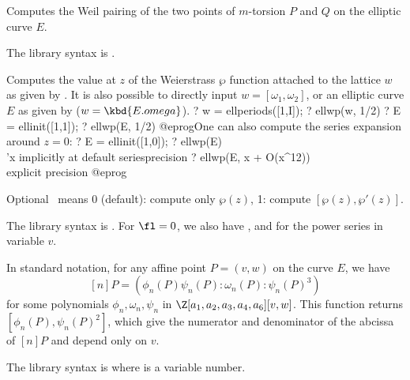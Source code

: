 \label{se:ellweilpairing}
Computes the Weil pairing of the two points of $m$-torsion $P$ and $Q$
on the elliptic curve $E$.

The library syntax is .

\label{se:ellwp}
Computes the value at $z$ of the Weierstrass $\wp$ function attached to
the lattice $w$ as given by . It is also possible to
directly input $w = [\omega_1,\omega_2]$, or an elliptic curve $E$ as given
by  ($w = \kbd{E.omega}$).
\bprog
? w = ellperiods([1,I]);
? ellwp(w, 1/2)
? E = ellinit([1,1]);
? ellwp(E, 1/2)
@eprog\noindent One can also compute the series expansion around $z = 0$:
\bprog
? E = ellinit([1,0]);
? ellwp(E)              \\ 'x implicitly at default seriesprecision
? ellwp(E, x + O(x^12)) \\ explicit precision
@eprog

Optional \fl\ means 0 (default): compute only $\wp(z)$, 1: compute
$[\wp(z),\wp'(z)]$.

The library syntax is .
For $\fl = 0$, we also have
, and
 for the power series in
variable $v$.

\label{se:ellxn}
In standard notation, for any affine point $P = (v,w)$ on the
curve $E$, we have
$$[n]P = (\phi_n(P)\psi_n(P) : \omega_n(P) : \psi_n(P)^3)$$
for some polynomials $\phi_n,\omega_n,\psi_n$ in
$\Z[a_1,a_2,a_3,a_4,a_6][v,w]$. This function returns
$[\phi_n(P),\psi_n(P)^2]$, which give the numerator and denominator of
the abcissa of $[n]P$ and depend only on $v$.

The library syntax is  where  is a variable number.

